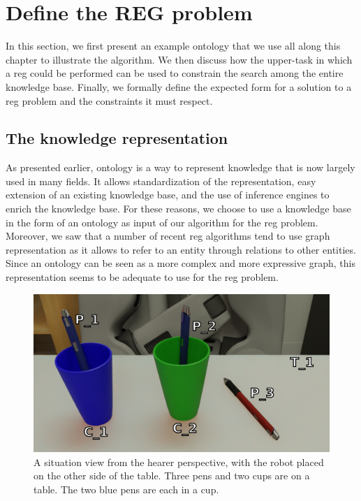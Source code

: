 \section{Define the REG problem}

In this section, we first present an example ontology that we use all along this chapter to illustrate the algorithm. We then discuss how the upper-task in which a \acrshort{reg} could be performed can be used to constrain the search among the entire knowledge base. Finally, we formally define the expected form for a solution to a \acrshort{reg} problem and the constraints it must respect.


\subsection{The knowledge representation}
\label{sec:chap4_kb}

As presented earlier, ontology is a way to represent knowledge that is now largely used in many fields. It allows standardization of the representation, easy extension of an existing knowledge base, and the use of inference engines to enrich the knowledge base. For these reasons, we choose to use a knowledge base in the form of an ontology as input of our algorithm for the \acrshort{reg} problem. Moreover, we saw that a number of recent \acrshort{reg} algorithms tend to use graph representation as it allows to refer to an entity through relations to other entities. Since an ontology can be seen as a more complex and more expressive graph, this representation seems to be adequate to use for the \acrshort{reg} problem. 

\begin{figure}[ht!]
\centering
\includegraphics[scale=0.2]{figures/chapter4/pens.png}
\caption{\label{fig:chap4_kb} A situation view from the hearer perspective, with the robot placed on the other side of the table. Three pens and two cups are on a table. The two blue pens are each in a cup. }
\end{figure}

